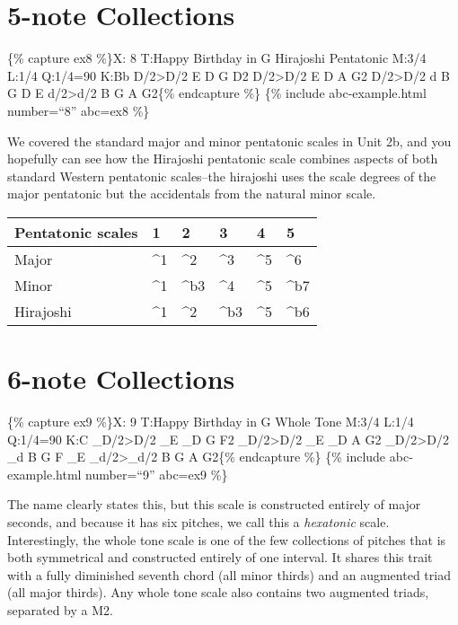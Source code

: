 \documentclass{book}
\begin{document}
\hypertarget{note-collections}{%
\section{5-note Collections}\label{note-collections}}

\{\% capture ex8 \%\}X: 8 T:Happy Birthday in G Hirajoshi Pentatonic M:3/4
L:1/4 Q:1/4=90 K:Bb D/2\textgreater D/2\textbar{} E D G\textbar{} D2
D/2\textgreater D/2\textbar{} E D A\textbar{} G2 D/2\textgreater D/2\textbar{}
d B G\textbar{} D E d/2\textgreater d/2\textbar{} B G A\textbar{}
G2\textbar{]}\{\% endcapture \%\} \{\% include abc-example.html number=``8''
abc=ex8 \%\}

We covered the standard major and minor pentatonic scales in Unit 2b, and you
hopefully can see how the Hirajoshi pentatonic scale combines aspects of both
standard Western pentatonic scales--the hirajoshi uses the scale degrees of
the major pentatonic but the accidentals from the natural minor scale.

\begin{longtable}[]{@{}llllll@{}}
\toprule
Pentatonic scales & 1 & 2 & 3 & 4 & 5 \\
\midrule
\endhead
Major & \^{}1 & \^{}2 & \^{}3 & \^{}5 & \^{}6 \\
Minor & \^{}1 & \^{}b3 & \^{}4 & \^{}5 & \^{}b7 \\
Hirajoshi & \^{}1 & \^{}2 & \^{}b3 & \^{}5 & \^{}b6 \\
\bottomrule
\end{longtable}

\hypertarget{note-collections-1}{%
\section{6-note Collections}\label{note-collections-1}}

\{\% capture ex9 \%\}X: 9 T:Happy Birthday in G Whole Tone M:3/4 L:1/4
Q:1/4=90 K:C \_D/2\textgreater D/2\textbar{} \_E \_D G\textbar{} F2
\_D/2\textgreater D/2\textbar{} \_E \_D A\textbar{} G2
\_D/2\textgreater D/2\textbar{} \_d B G\textbar{} F \_E
\_d/2\textgreater\_d/2\textbar{} B G A\textbar{} G2\textbar{]}\{\% endcapture
\%\} \{\% include abc-example.html number=``9'' abc=ex9 \%\}

The name clearly states this, but this scale is constructed entirely of major
seconds, and because it has six pitches, we call this a \emph{hexatonic}
scale. Interestingly, the whole tone scale is one of the few collections of
pitches that is both symmetrical and constructed entirely of one interval. It
shares this trait with a fully diminished seventh chord (all minor thirds) and
an augmented triad (all major thirds). Any whole tone scale also contains two
augmented triads, separated by a M2.
\end{document}
